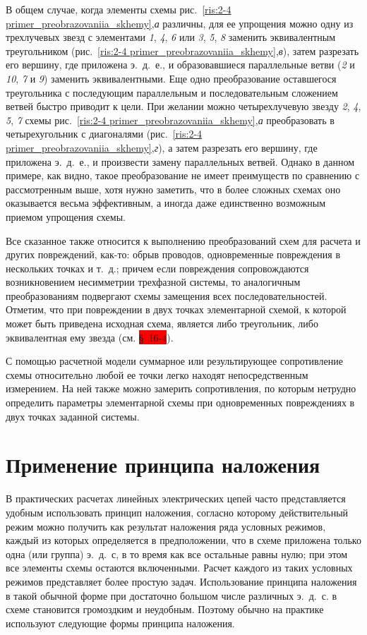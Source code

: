 В общем случае, когда элементы схемы рис.~\ref{ris:2-4 primer_preobrazovaniia_skhemy},\textit{а} различны, для ее упрощения можно одну из трехлучевых звезд с элементами \textit{1}, \textit{4}, \textit{6} или \textit{3}, \textit{5}, \textit{8} заменить эквивалентным треугольником (рис.~\ref{ris:2-4 primer_preobrazovaniia_skhemy},\textit{в}), затем разрезать его вершину, где приложена э.~д.~е., и образовавшиеся параллельные ветви (\textit{2} и \textit{10}, \textit{7} и \textit{9}) заменить эквивалентными. Еще одно преобразование оставшегося треугольника с последующим параллельным и последовательным сложением ветвей быстро приводит к цели. При желании можно четырехлучевую звезду \textit{2}, \textit{4}, \textit{5}, \textit{7} схемы рис.~\ref{ris:2-4 primer_preobrazovaniia_skhemy},\textit{а} преобразовать в четырехугольник с диагоналями (рис.~\ref{ris:2-4 primer_preobrazovaniia_skhemy},\textit{г}), а затем разрезать его вершину, где приложена э.~д.~е., и произвести замену параллельных ветвей. Однако в данном примере, как видно, такое преобразование не имеет преимуществ по сравнению с рассмотренным выше, хотя нужно заметить, что в более сложных схемах оно оказывается весьма эффективным, а иногда даже единственно возможным приемом упрощения схемы.

Все сказанное также относится к выполнению преобразований схем для расчета и других повреждений, как-то: обрыв проводов, одновременные повреждения в нескольких точках и т.~д.; причем если повреждения сопровождаются возникновением несимметрии трехфазной системы, то аналогичным преобразованиям подвергают схемы замещения всех последовательностей. Отметим, что при повреждении в двух точках элементарной схемой, к которой может быть приведена исходная схема, является либо треугольник, либо эквивалентная ему звезда (см. \colorbox{red}{§~16-4}).

С помощью расчетной модели суммарное или результирующее сопротивление схемы относительно любой ее точки легко находят непосредственным измерением. На ней также можно замерить сопротивления, по которым нетрудно определить параметры элементарной схемы при одновременных повреждениях в двух точках заданной системы.

\section{Применение принципа наложения}
\label{sec:2-6}

В практических расчетах линейных электрических цепей часто представляется удобным использовать принцип наложения, согласно которому действительный режим можно получить как результат наложения ряда условных режимов, каждый из которых определяется в предположении, что в схеме приложена только одна (или группа) э.~д.~с, в то время как все остальные равны нулю; при этом все элементы схемы остаются включенными. Расчет каждого из таких условных режимов представляет более простую задач. Использование принципа наложения в такой обычной форме при достаточно большом числе различных э.~д.~с. в схеме становится громоздким и неудобным. Поэтому обычно на практике используют следующие формы принципа наложения.

